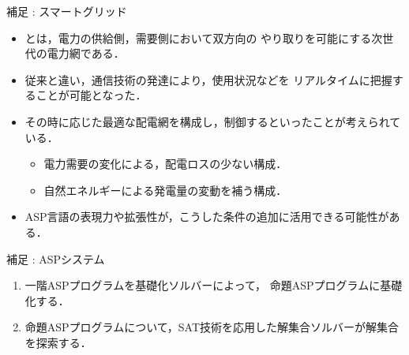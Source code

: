 \documentclass[dvipdfmx,11pt]{beamer}
\begin{document}
\begin{frame}{補足 : スマートグリッド}
 \begin{itemize}
  \item {}とは，電力の供給側，需要側において双方向の
		やり取りを可能にする次世代の電力網である．
  \item 従来と違い，通信技術の発達により，使用状況などを
		リアルタイムに把握することが可能となった．
  \item その時に応じた最適な配電網を構成し，制御するといったことが考えられている．
		\begin{itemize}
		 \item 電力需要の変化による，配電ロスの少ない構成．
		 \item 自然エネルギーによる発電量の変動を補う構成．
		\end{itemize}
  \item ASP言語の表現力や拡張性が，こうした条件の追加に活用できる可能性がある．
 \end{itemize}
\end{frame}

\begin{frame}{補足 : ASPシステム}
 
 \vspace{-0.5cm}

 \begin{figure}[htbp]
  \centering
  
 \end{figure}

 \vspace{-0.5cm}

 \begin{exampleblock}{}
  \begin{enumerate}
   \item 一階ASPプログラムを基礎化ソルバーによって，
		 命題ASPプログラムに\alert{基礎化}する．
   \item 命題ASPプログラムについて，SAT技術を応用した解集合ソルバーが解集合を探索する．
  \end{enumerate}
 \end{exampleblock}

\end{frame}
\end{document}
